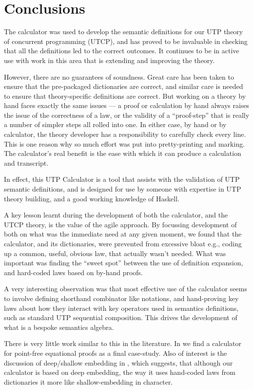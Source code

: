 \section{Conclusions}\label{sec:Conc}

The calculator was used to develop the semantic definitions
for our UTP theory of concurrent programming (UTCP),
and has proved to be invaluable in checking that all
the definitions led to the correct outcomes.
It continues to be in active use with work in this area
that is extending and improving the theory.

However, there are no guarantees of soundness.
Great care has been taken to ensure that the pre-packaged
dictionaries are correct,
and similar care is needed to ensure that theory-specific
definitions are correct.
But working on a theory by hand faces exactly the same issues
--- a proof or calculation by hand always raises the issue
of the correctness of a law, or the validity of a ``proof-step''
that is really a number of simpler steps all rolled into one.
In either case, by hand or by calculator,
the theory developer has a responsibility to carefully check every line.
This is one reason why so much effort was put into pretty-printing
and marking. 
The calculator's real benefit is the ease with which
it can produce a calculation and transcript.

In effect, this UTP Calculator is a tool that assists
with the validation of UTP semantic definitions,
and is designed for use by someone with expertise
in UTP theory building,
and a good working knowledge of Haskell.

A key lesson learnt during the development
of both the calculator, and the UTCP theory,
is the value of the agile approach.
By focussing development of both on what
was the immediate need at any given moment,
we found that the calculator, and its dictionaries,
were prevented from excessive bloat
e.g., coding up a common, useful, obvious law,
that actually wasn't needed.
What was important was 
finding the ``sweet spot'' between the use of definition
expansion, and hard-coded laws based on by-hand proofs.

A very interesting observation was that most effective use
of the calculator seems to involve defining shorthand 
combinator like notations, and hand-proving key laws
about how they interact with key operators used
in semantics definitions, such as standard UTP sequential composition.
This drives the development of what is a bespoke semantics algebra.


There is very little work similar to this in the literature.
In \cite{Bird14} we find a calculator
for point-free equational proofs as a final case-study.
Also of interest is the discussion of deep/shallow embedding
in \cite{Gibbons:2014:FDS},
which suggests, that although our calculator is based on deep embedding,
the way it uses hand-coded laws from dictionaries
it more like shallow-embedding in character.



